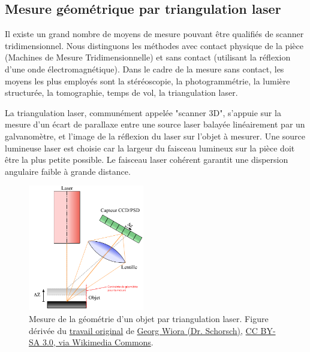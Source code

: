 \subsection{Mesure géométrique par triangulation laser} \label{subsec:scan3D}
Il existe un grand nombre de moyens de mesure pouvant être qualifiés de scanner tridimensionnel.
Nous distinguons les méthodes avec contact physique de la pièce (Machines de Mesure Tridimensionnelle) et sans contact (utilisant la réflexion d'une onde électromagnétique).
Dans le cadre de la mesure sans contact, les moyens les plus employés sont la stéréoscopie, la photogrammétrie, la lumière structurée, la tomographie, temps de vol, la triangulation laser.

La triangulation laser, communément appelée "scanner 3D", s'appuie sur la mesure d'un écart de parallaxe entre une source laser balayée linéairement par un galvanomètre, et l'image de la réflexion du laser sur l'objet à mesurer.
Une source lumineuse laser est choisie car la largeur du faisceau lumineux sur la pièce doit être la plus petite possible.
Le faisceau laser cohérent garantit une dispersion angulaire faible à grande distance.

\begin{figure}[htbp]
	\centering
	\includegraphics[width=0.45\textwidth]{../Chap2/Figures/Laserprofilometer_FR.pdf}
	\caption{Mesure de la géométrie d'un objet par triangulation laser. Figure dérivée du \href{https://commons.wikimedia.org/wiki/File:Laserprofilometer_EN.svg}{travail original} de \href{https://de.wikipedia.org/wiki/Benutzer:Xorx}{Georg Wiora (Dr. Schorsch)}, \href{http://creativecommons.org/licenses/by-sa/3.0/}{CC BY-SA 3.0, via Wikimedia Commons}.}
	\label{fig:laser_scanning}
\end{figure}

